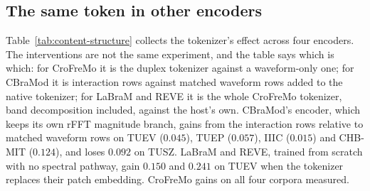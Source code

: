 \subsection{The same token in other encoders}
\label{sec:content-structure}

Table~\ref{tab:content-structure} collects the tokenizer's effect across
four encoders. The interventions are not the same experiment, and the
table says which is which: for CroFreMo it is the duplex tokenizer against
a waveform-only one; for CBraMod it is interaction rows against matched
waveform rows added to the native tokenizer; for LaBraM and REVE it is the
whole CroFreMo tokenizer, band decomposition included, against the host's
own. CBraMod's encoder, which keeps its own rFFT magnitude branch, gains from
the interaction rows relative to matched waveform rows on TUEV ($0.045$),
TUEP ($0.057$), IIIC ($0.015$) and CHB-MIT ($0.124$), and loses $0.092$ on
TUSZ. LaBraM and REVE, trained from scratch with no spectral pathway,
gain $0.150$ and $0.241$ on TUEV when the tokenizer replaces their patch
embedding. CroFreMo gains on all four corpora measured.

\begin{table}[t]
\centering
\scriptsize
\caption{Tokenizer benefit across four encoders. The interventions differ
and the numbers are not one quantity: duplex vs.\ waveform-only tokenizer
(CroFreMo); interaction rows vs.\ matched waveform rows added to the
native tokenizer (CBraMod); the whole CroFreMo tokenizer vs.\ the native
tokenizer (LaBraM, REVE). Single seeds.}
\label{tab:content-structure}
\end{table}

